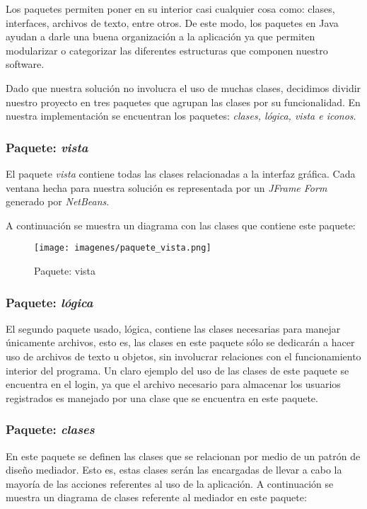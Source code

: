 \documentclass[12pt]{article}
\begin{document}
\par Los paquetes permiten poner en su interior casi cualquier cosa como: clases, interfaces, archivos de texto, entre otros. De este modo, los paquetes en Java ayudan a darle una buena organización a la aplicación ya que permiten modularizar o categorizar las diferentes estructuras que componen nuestro software.\\

\par Dado que nuestra solución no involucra el uso de muchas clases, decidimos dividir nuestro proyecto en tres paquetes que agrupan las clases por su funcionalidad. En nuestra implementación se encuentran los paquetes: \textit{clases, lógica, vista e iconos}. 

\subsubsection{Paquete: \textit{vista}}
El paquete \textit{vista} contiene todas las clases relacionadas a la interfaz gráfica. Cada ventana hecha para nuestra solución es representada por un \textit{JFrame Form} generado por \textit{NetBeans}.

\par A continuación se muestra un diagrama con las clases que contiene este paquete:

\begin{figure}[H]
\centering
\texttt{[image: imagenes/paquete\_vista.png]}
\caption{Paquete: vista}
\end{figure} 

\subsubsection{Paquete: \textit{lógica}}
El segundo paquete usado, lógica, contiene las clases necesarias para manejar únicamente archivos, esto es, las clases en este paquete sólo se dedicarán a hacer uso de archivos de texto u objetos, sin involucrar relaciones con el funcionamiento interior del programa. Un claro ejemplo del uso de las clases de este paquete se encuentra en el login, ya que el archivo necesario para almacenar los usuarios registrados es manejado por una clase que se encuentra en este paquete.

\subsubsection{Paquete: \textit{clases}}
En este paquete se definen las clases que se relacionan por medio de un patrón de diseño mediador. Esto es, estas clases serán las encargadas de llevar a cabo la mayoría de las acciones referentes al uso de la aplicación. A continuación se muestra un diagrama de clases referente al mediador en este paquete:
\end{document}
